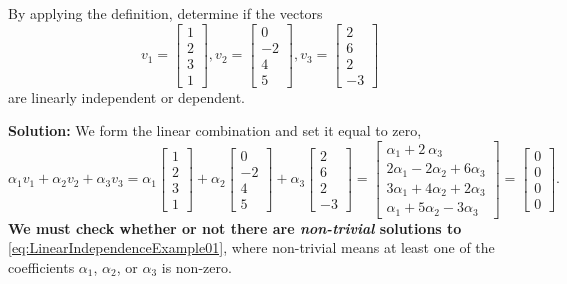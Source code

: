 \begin{example} 
\label{ex:LinearIndep01} By applying the definition, determine  if the vectors 
$$v_1 = \left[ \begin{array}{r} 1 \\2\\  3 \\1  \end{array} \right]  , v_2 = \left[ \begin{array}{r}  0 \\ -2  \\4 \\ 5  \end{array} \right], v_3 = \left[ \begin{array}{r} 2 \\ 6 \\ 2  \\ -3 \end{array} \right] $$
are linearly independent or dependent.
\end{example}

\textbf{Solution:} We form the linear combination and set it equal to zero,
\begin{equation}
\label{eq:LinearIndependenceExample01}
    \alpha_1 v_1 + \alpha_2 v_2 + \alpha_3 v_3 = 
    \alpha_1 \left[ \begin{array}{r} 1 \\2\\  3 \\1  \end{array} \right] 
+ \alpha_2 \left[ \begin{array}{r}  0 \\ -2  \\4 \\ 5  \end{array} \right]
+ \alpha_3 \left[ \begin{array}{r} 2 \\ 6 \\ 2  \\ -3 \end{array} \right]  = \left[ \begin{array}{r} \alpha_1  +2\ \alpha_3 \\ 2 \alpha_1 -2 \alpha_2 + 6 \alpha_3\\ 3 \alpha_1+ 4 \alpha_2 +  2 \alpha_3  \\ \alpha_1+ 5 \alpha_2 -3 \alpha_3 \end{array} \right] = \left[ \begin{array}{r}  0 \\ 0 \\0 \\0  \end{array} \right].
\end{equation}
\textbf{We must check whether or not there are \textit{non-trivial} solutions to} \eqref{eq:LinearIndependenceExample01}, where non-trivial means at least one of the coefficients $\alpha_1$,  $\alpha_2$, or  $\alpha_3$ is non-zero.\\ 

